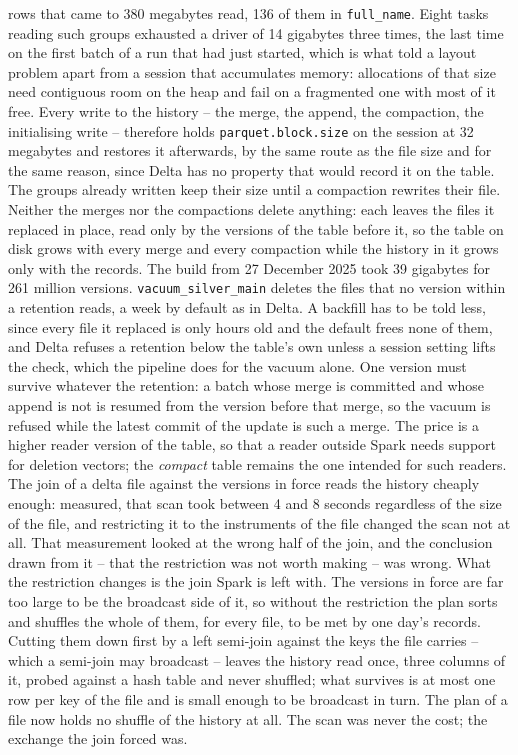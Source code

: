 rows that came to 380 megabytes read, 136 of them in \verb|full_name|. Eight tasks reading such groups exhausted a driver of 14 gigabytes three times, the last time on the first batch of a run that had just started, which is what told a layout problem apart from a session that accumulates memory: allocations of that size need contiguous room on the heap and fail on a fragmented one with most of it free. Every write to the history -- the merge, the append, the compaction, the initialising write -- therefore holds \verb|parquet.block.size| on the session at 32 megabytes and restores it afterwards, by the same route as the file size and for the same reason, since Delta has no property that would record it on the table. The groups already written keep their size until a compaction rewrites their file. Neither the merges nor the compactions delete anything: each leaves the files it replaced in place, read only by the versions of the table before it, so the table on disk grows with every merge and every compaction while the history in it grows only with the records. The build from 27 December 2025 took 39 gigabytes for 261 million versions. \verb|vacuum_silver_main| deletes the files that no version within a retention reads, a week by default as in Delta. A backfill has to be told less, since every file it replaced is only hours old and the default frees none of them, and Delta refuses a retention below the table's own unless a session setting lifts the check, which the pipeline does for the vacuum alone. One version must survive whatever the retention: a batch whose merge is committed and whose append is not is resumed from the version before that merge, so the vacuum is refused while the latest commit of the update is such a merge. The price is a higher reader version of the table, so that a reader outside Spark needs support for deletion vectors; the \emph{compact} table remains the one intended for such readers. The join of a delta file against the versions in force reads the history cheaply enough: measured, that scan took between 4 and 8 seconds regardless of the size of the file, and restricting it to the instruments of the file changed the scan not at all. That measurement looked at the wrong half of the join, and the conclusion drawn from it -- that the restriction was not worth making -- was wrong. What the restriction changes is the join Spark is left with. The versions in force are far too large to be the broadcast side of it, so without the restriction the plan sorts and shuffles the whole of them, for every file, to be met by one day's records. Cutting them down first by a left semi-join against the keys the file carries -- which a semi-join may broadcast -- leaves the history read once, three columns of it, probed against a hash table and never shuffled; what survives is at most one row per key of the file and is small enough to be broadcast in turn. The plan of a file now holds no shuffle of the history at all. The scan was never the cost; the exchange the join forced was.

